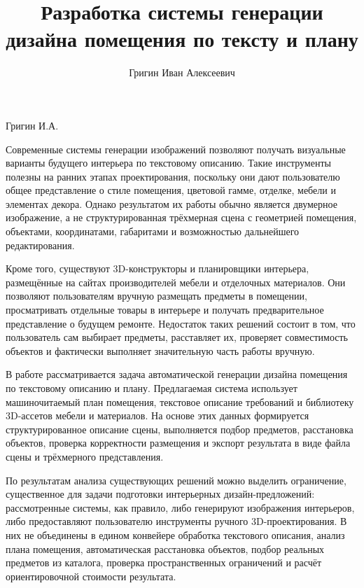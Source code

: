\documentclass[times]{itmo-student-thesis}
\begin{document}
\title{Разработка системы генерации дизайна помещения по тексту и плану}
\author{Григин Иван Алексеевич}{Григин И.А.}

\setlength{\headheight}{17pt}
\tableofcontents

\startprefacepage

Современные системы генерации изображений позволяют получать визуальные варианты будущего интерьера по текстовому описанию. Такие инструменты полезны на ранних этапах проектирования, поскольку они дают пользователю общее представление о стиле помещения, цветовой гамме, отделке, мебели и элементах декора. Однако результатом их работы обычно является двумерное изображение, а не структурированная трёхмерная сцена с геометрией помещения, объектами, координатами, габаритами и возможностью дальнейшего редактирования.

Кроме того, существуют 3D-конструкторы и планировщики интерьера, размещённые на сайтах производителей мебели и отделочных материалов. Они позволяют пользователям вручную размещать предметы в помещении, просматривать отдельные товары в интерьере и получать предварительное представление о будущем ремонте. Недостаток таких решений состоит в том, что пользователь сам выбирает предметы, расставляет их, проверяет совместимость объектов и фактически выполняет значительную часть работы вручную.

В работе рассматривается задача автоматической генерации дизайна помещения по текстовому описанию и плану. Предлагаемая система использует машиночитаемый план помещения, текстовое описание требований и библиотеку 3D-ассетов мебели и материалов. На основе этих данных формируется структурированное описание сцены, выполняется подбор предметов, расстановка объектов, проверка корректности размещения и экспорт результата в виде файла сцены и трёхмерного представления.

По результатам анализа существующих решений можно выделить ограничение, существенное для задачи подготовки интерьерных дизайн-предложений: рассмотренные системы, как правило, либо генерируют изображения интерьеров, либо предоставляют пользователю инструменты ручного 3D-проектирования. В них не объединены в едином конвейере обработка текстового описания, анализ плана помещения, автоматическая расстановка объектов, подбор реальных предметов из каталога, проверка пространственных ограничений и расчёт ориентировочной стоимости результата.
\end{document}
